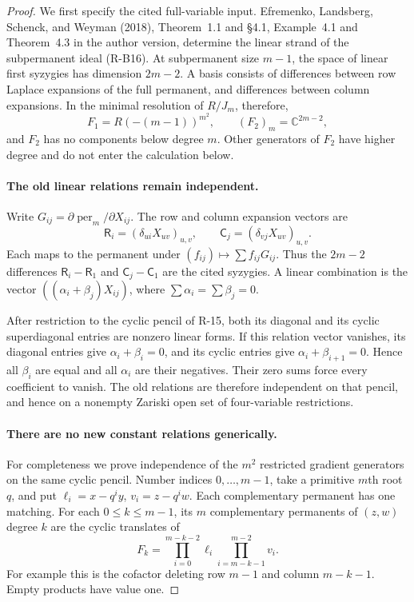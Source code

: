 \begin{proof}
We first specify the cited full-variable input. Efremenko, Landsberg,
Schenck, and Weyman (2018), Theorem~1.1 and \S4.1, Example~4.1
and Theorem~4.3 in the author version, determine the linear strand
of the subpermanent ideal (R-B16). At subpermanent size $m-1$, the
space of linear first syzygies has dimension $2m-2$. A basis consists
of differences between row Laplace expansions of the full permanent,
and differences between column expansions. In the minimal resolution
of $R/J_m$, therefore,
\begin{equation}\label{R23:resolution_start}
 F_1=R(-(m-1))^{m^2},\qquad
 (F_2)_m=\mathbb C^{2m-2},
\end{equation}
and $F_2$ has no components below degree $m$. Other generators of
$F_2$ have higher degree and do not enter the calculation below.

\paragraph{The old linear relations remain independent.}
Write $G_{ij}=\partial\operatorname{per}_m/\partial X_{ij}$.
The row and column expansion vectors are
\[
 \mathsf R_i=(\delta_{ui}X_{uv})_{u,v},\qquad
 \mathsf C_j=(\delta_{vj}X_{uv})_{u,v}.
\]
Each maps to the permanent under $(f_{ij})\mapsto\sum f_{ij}G_{ij}$.
Thus the $2m-2$ differences
$\mathsf R_i-\mathsf R_1$ and $\mathsf C_j-\mathsf C_1$ are
the cited syzygies. A linear combination is the vector
$((\alpha_i+\beta_j)X_{ij})$, where
$\sum\alpha_i=\sum\beta_j=0$.

After restriction to the cyclic pencil of R-15, both its diagonal
and its cyclic superdiagonal entries are nonzero linear forms.
If this relation vector vanishes, its diagonal entries give
$\alpha_i+\beta_i=0$, and its cyclic entries give
$\alpha_i+\beta_{i+1}=0$. Hence all $\beta_i$ are equal and all
$\alpha_i$ are their negatives. Their zero sums force every
coefficient to vanish. The old relations are therefore independent
on that pencil, and hence on a nonempty Zariski open set of
four-variable restrictions.

\paragraph{There are no new constant relations generically.}
For completeness we prove independence of the $m^2$ restricted
gradient generators on the same cyclic pencil. Number indices
$0,\ldots,m-1$, take a primitive $m$th root $q$, and put
$\ell_i=x-q^iy$, $v_i=z-q^iw$. Each complementary permanent has
one matching. For each $0\leq k\leq m-1$, its $m$ complementary
permanents of $(z,w)$ degree $k$ are the cyclic translates of
\begin{equation}\label{R23:cofactor_orbit}
 F_k=\prod_{i=0}^{m-k-2}\ell_i
                 \prod_{i=m-k-1}^{m-2}v_i.
\end{equation}
For example this is the cofactor deleting row $m-1$ and column
$m-k-1$. Empty products have value one.


\end{proof}
